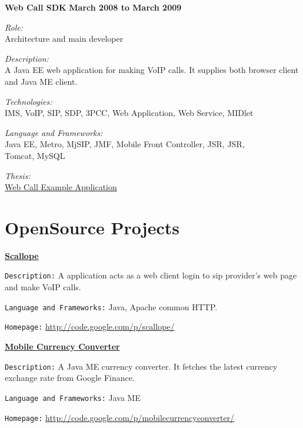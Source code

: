 \textbf{Web Call SDK}
\hfill \textbf{March 2008 to March 2009}
\begin{outerlist}
\item \textit{Role:}\\
Architecture and main developer
\item \textit{Description:}\\
A Java EE web application for making VoIP calls. It supplies both browser client and Java ME client. 
\item \textit{Technologies:}\\
IMS, VoIP, SIP, SDP, 3PCC, Web Application, Web Service, MIDlet
\item \textit{Language and Frameworks:}\\
Java EE, Metro, MjSIP, JMF, Mobile Front Controller, JSR\nobreak{}, JSR\nobreak{},\\ Tomcat, MySQL
\item \textit{Thesis:}\\
\href{http://shanbohomepage.googlecode.com/hg/master_thesis/master_thesis.pdf}{Web Call Example Application}
\end{outerlist}
\blankline


\section{OpenSource Projects}
\href{http://code.google.com/p/scallope/}{\textbf{Scallope}} 
\begin{outerlist}
\item \texttt{Description:}
A application acts as a web client login to sip provider's web page and make VoIP calls. 
\item \texttt{Language and Frameworks:}
Java, Apache common HTTP.
\item \texttt{Homepage:}
\href{http://code.google.com/p/scallope/}{http://code.google.com/p/scallope/}
\end{outerlist}

\blankline

\href{http://code.google.com/p/mobilecurrencyconverter/}{\textbf{Mobile Currency Converter}} 
\begin{outerlist}
\item \texttt{Description:}
A Java ME currency converter. It fetches the latest currency exchange rate from Google Finance. 
\item \texttt{Language and Frameworks:}
Java ME
\item \texttt{Homepage:}
\href{http://code.google.com/p/mobilecurrencyconverter/}{http://code.google.com/p/mobilecurrencyconverter/}
\end{outerlist}

